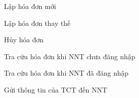 Lập hóa đơn mới













Lập hóa đơn thay thế













Hủy hóa đơn


























Tra cứu hóa đơn khi NNT chưa đăng nhập













Tra cứu hóa đơn khi NNT đã đăng nhập


























Gửi thông tin của TCT đến NNT
